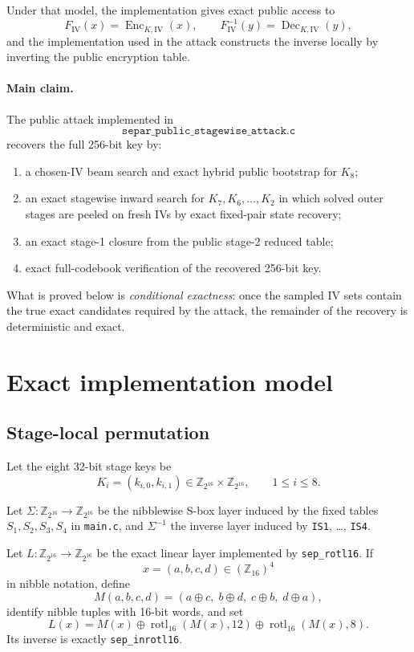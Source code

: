 \documentclass[11pt]{article}
\newcommand{\Z}[1]{\mathbb{Z}_{#1}}
\newcommand{\rot}{\operatorname{rotl}_{16}}
\begin{document}
Under that model, the implementation gives exact public access to
\[
F_{\mathrm{IV}}(x)=\operatorname{Enc}_{K,\mathrm{IV}}(x),
\qquad
F_{\mathrm{IV}}^{-1}(y)=\operatorname{Dec}_{K,\mathrm{IV}}(y),
\]
and the implementation used in the attack constructs the inverse locally by inverting the public encryption table.

\paragraph{Main claim.}
The public attack implemented in
\[
\texttt{separ\_public\_stagewise\_attack.c}
\]
recovers the full 256-bit key by:
\begin{enumerate}[label=\arabic*.,leftmargin=1.5em]
\item a chosen-IV beam search and exact hybrid public bootstrap for $K_8$;
\item an exact stagewise inward search for $K_7,K_6,\dots,K_2$ in which solved outer stages are peeled on fresh IVs by exact fixed-pair state recovery;
\item an exact stage-1 closure from the public stage-2 reduced table;
\item exact full-codebook verification of the recovered 256-bit key.
\end{enumerate}

What is proved below is \emph{conditional exactness}: once the sampled IV sets contain the true exact candidates required by the attack, the remainder of the recovery is deterministic and exact.

\section{Exact implementation model}
\subsection{Stage-local permutation}
Let the eight 32-bit stage keys be
\[
K_i=(k_{i,0},k_{i,1})\in \Z{2^{16}}\times \Z{2^{16}},
\qquad 1\le i\le 8.
\]

Let $\Sigma:\Z{2^{16}}\to\Z{2^{16}}$ be the nibblewise S-box layer induced by the fixed tables $S_1,S_2,S_3,S_4$ in \texttt{main.c}, and $\Sigma^{-1}$ the inverse layer induced by \texttt{IS1}, \dots, \texttt{IS4}.

Let $L:\Z{2^{16}}\to\Z{2^{16}}$ be the exact linear layer implemented by \texttt{sep\_rotl16}. If
\[
x=(a,b,c,d)\in(\Z{16})^4
\]
in nibble notation, define
\[
M(a,b,c,d)=(a\oplus c,\;b\oplus d,\;c\oplus b,\;d\oplus a),
\]
identify nibble tuples with 16-bit words, and set
\[
L(x)=M(x)\oplus \rot(M(x),12)\oplus \rot(M(x),8).
\]
Its inverse is exactly \texttt{sep\_inrotl16}.
\end{document}
